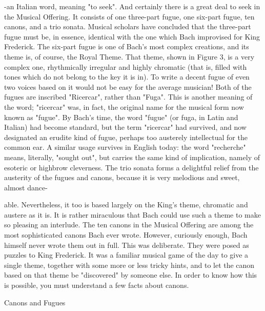 -an Italian word, meaning "to seek". And certainly there is a great deal to seek in the Musical Offering. It consists of one three-part fugue, one six-part fugue, ten canons, and a trio sonata. Musical scholars have concluded that the three-part fugue must be, in essence, identical with the one which Bach improvised for King Frederick. The six-part fugue is one of Bach's most complex creations, and its theme is, of course, the Royal Theme. That theme, shown in Figure 3, is a very complex one, rhythmically irregular and highly chromatic (that is, filled with tones which do not belong to the key it is in). To write a decent fugue of even two voices based on it would not be easy for the average musician! Both of the fugues are inscribed "Ricercar", rather than "Fuga". This is another meaning of the word; "ricercar" was, in fact, the original name for the musical form now known as "fugue". By Bach's time, the word "fugue" (or fuga, in Latin and Italian) had become standard, but the term "ricercar" had survived, and now designated an erudite kind of fugue, perhaps too austerely intellectual for the common ear. A similar usage survives in English today: the word "recherche" means, literally, "sought out", but carries the same kind of implication, namely of esoteric or highbrow cleverness. The trio sonata forms a delightful relief from the austerity of the fugues and canons, because it is very melodious and sweet, almost dance- 





able. Nevertheless, it too is based largely on the King's theme, chromatic and austere as it is. It is rather miraculous that Bach could use such a theme to make so pleasing an interlude. The ten canons in the Musical Offering are among the most sophisticated canons Bach ever wrote. However, curiously enough, Bach himself never wrote them out in full. This was deliberate. They were posed as puzzles to King Frederick. It was a familiar musical game of the day to give a single theme, together with some more or less tricky hints, and to let the canon based on that theme be "discovered" by someone else. In order to know how this is possible, you must understand a few facts about canons. 

Canons and Fugues 


